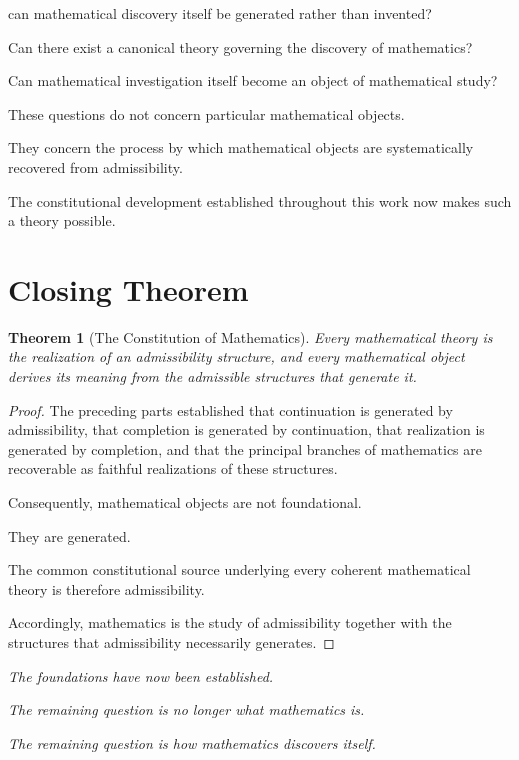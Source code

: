 \documentclass[13pt,openany]{book}
\theoremstyle{plain}
\newtheorem{theorem}{Theorem}[chapter]
\theoremstyle{definition}
\begin{document}
can mathematical discovery itself be generated rather than invented?

Can there exist a canonical theory governing the discovery of mathematics?

Can mathematical investigation itself become an object of mathematical study?

These questions do not concern particular mathematical objects.

They concern the process by which mathematical objects are systematically
recovered from admissibility.

The constitutional development established throughout this work now makes such
a theory possible.

\section{Closing Theorem}

\begin{theorem}[The Constitution of Mathematics]
Every mathematical theory is the realization of an admissibility structure, and
every mathematical object derives its meaning from the admissible structures
that generate it.
\end{theorem}

\begin{proof}
The preceding parts established that continuation is generated by admissibility,
that completion is generated by continuation, that realization is generated by
completion, and that the principal branches of mathematics are recoverable as
faithful realizations of these structures.

Consequently, mathematical objects are not foundational.

They are generated.

The common constitutional source underlying every coherent mathematical theory
is therefore admissibility.

Accordingly, mathematics is the study of admissibility together with the
structures that admissibility necessarily generates.
\end{proof}

\vspace{1em}

\begin{center}
\Large
\emph{The foundations have now been established.}

\vspace{0.75em}

\emph{The remaining question is no longer what mathematics is.}

\vspace{0.75em}

\emph{The remaining question is how mathematics discovers itself.}
\end{center}
\end{document}
